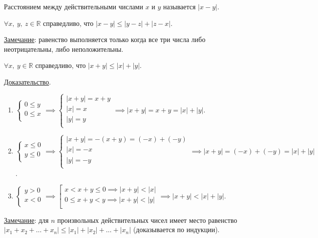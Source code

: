 \documentclass{article}
\begin{document}
    \begin{definition}
        Расстоянием между действительными числами \(x\) и \(y\) называется \(|x - y|\). 
    \end{definition}
    \begin{claim}
        \(\forall x,\ y,\ z \in \mathbb{R}\) справедливо, что \(|x - y| \leq |y - z| + |z - x|\).  
    \end{claim}
    \noindent
    \underline{Замечание}: равенство выполняется только когда все три числа либо неотрицательны, либо неположительны.
    \begin{claim}
        \(\forall x,\ y \in \mathbb{R}\) справедливо, что \(|x + y| \leq |x| + |y|\).  
    \end{claim}
    \noindent
    \underline{Доказательство}.\\
    \begin{enumerate}
        \item 
        \(\begin{cases}
            0 \leq y\\
            0 \leq x\\
        \end{cases} \implies
        \begin{cases}
            |x + y| = x + y\\
            |x| = x\\
            |y| = y\\
        \end{cases} \implies |x + y| = x + y = |x| + |y|\).
        \item 
        \(\begin{cases}
            x \leq 0\\ 
            y \leq  0\\
        \end{cases} \implies 
        \begin{cases}
            |x + y| = -(x + y) = (-x) + (-y)\\
            |x| = -x\\
            |y| = -y\\
        \end{cases} \implies |x + y| = (-x) + (-y) = |x| + |y|\).
        \item 
        \(\begin{cases}
            y > 0\\
            x < 0\\
        \end{cases} \implies 
        \left[
            \begin{gathered}
                x < x + y \leq 0 \implies |x + y| < |x|\\
                0 \leq x + y < y \implies |x + y| < |y|\\
            \end{gathered}
        \right. \implies |x + y| < |x| + |y|\). 
    \end{enumerate}
    \underline{Замечание}: для \(n\) произвольных действительных чисел имеет место равенство \(|x_{1} + x_{2} + \dots + x_{n}| \leq |x_{1}| + |x_{2}| + \dots + |x_{n}|\) (доказывается по индукции).  
\end{document}
